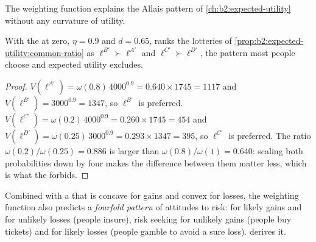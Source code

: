 The weighting function explains the Allais pattern of \cref{ch:b2:expected-utility} without any
curvature of utility.

\begin{proposition}\label{prop:b2:behavioural-evidence:common-ratio}
With the  at zero, $\eta = 0.9$ and $d = 0.65$,  ranks the lotteries of
\cref{prop:b2:expected-utility:common-ratio} as $\ell^{B'} \succ \ell^{A'}$ and $\ell^{C'} \succ
\ell^{D'}$, the pattern most people choose and expected utility excludes.
\end{proposition}

\begin{proof}
$V(\ell^{A'}) = \omega(0.8)\,4000^{0.9} = 0.640 \times 1745 = 1117$ and $V(\ell^{B'}) = 3000^{0.9} = 1347$,
so $\ell^{B'}$ is preferred. $V(\ell^{C'}) = \omega(0.2)\,4000^{0.9} = 0.260 \times 1745 = 454$ and
$V(\ell^{D'}) = \omega(0.25)\,3000^{0.9} = 0.293 \times 1347 = 395$, so $\ell^{C'}$ is preferred. The
ratio $\omega(0.2)/\omega(0.25) = 0.886$ is larger than $\omega(0.8)/\omega(1) = 0.640$: scaling both
probabilities down by four makes the difference between them matter less, which is what the
 forbids.
\end{proof}

Combined with a  that is concave for gains and convex for losses, the weighting function
also predicts a \emph{fourfold pattern} of attitudes to risk:  for likely gains and for
unlikely losses (people insure), risk seeking for unlikely gains (people buy  tickets) and for
likely losses (people gamble to avoid a sure loss).  derives it.

